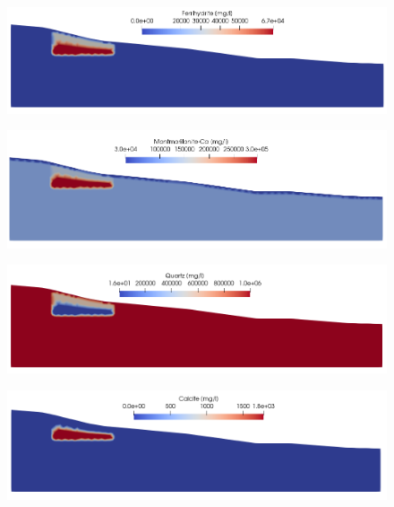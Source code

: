 \documentclass{article}
\begin{document}
\begin{figure}[H]
    \centering
    \includegraphics[width=\linewidth]{LJ-Ferrihydrite-concentration.PNG}
    \caption{}
    \label{fig:concentration_ferrihydrite}
\end{figure}

\begin{figure}[H]
    \centering
    \includegraphics[width=\linewidth]{LJ-Montmorillonite-concentration.PNG}
    \caption{}
    \label{fig:concentration_montmorilonite}
\end{figure}

\begin{figure}[H]
    \centering
    \includegraphics[width=\linewidth]{LJ-Quartz-concentration.PNG}
    \caption{}
    \label{fig:concentration_quartz}
\end{figure}
\begin{figure}[H]
    \centering
    \includegraphics[width=\linewidth]{LJ-Calcite-initial-concentration.PNG}
    \caption{}
    \label{fig:concentration_calcite_initial}
\end{figure}
\end{document}
